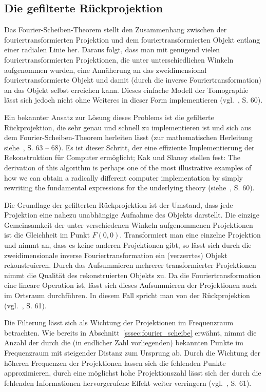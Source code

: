 \subsection{Die gefilterte Rückprojektion}\label{sssec:filter_bp}

Das Fourier-Scheiben-Theorem stellt den Zusammenhang zwischen der fouriertransformierten Projektion und dem
fouriertransformierten Objekt entlang einer radialen Linie her. Daraus folgt, dass man mit genügend vielen
fouriertransformierten Projektionen, die unter unterschiedlichen Winkeln aufgenommen wurden, eine Annäherung an das
zweidimensional fouriertransformierte Objekt und damit (durch die inverse Fouriertransformation) an das Objekt selbst
erreichen kann. Dieses einfache Modell der Tomographie lässt sich jedoch nicht ohne Weiteres in dieser Form
implementieren (vgl.~\cite{kakslan}, S. 60).

Ein bekannter Ansatz zur Lösung dieses Problems ist die gefilterte Rückprojektion, die sehr genau und schnell zu
implementieren ist und sich aus dem Fourier-Scheiben-Theorem herleiten lässt (zur mathematischen Herleitung
siehe~\cite{kakslan}, S. 63 -- 68). Es ist dieser Schritt, der eine effiziente Implementierung der Rekonstruktion für
Computer ermöglicht; Kak und Slaney stellen fest: {\glqq}The derivation of this algorithm is perhaps one of the most
illustrative examples of how we can obtain a radically different computer implementation by simply rewriting the
fundamental expressions for the underlying theory{\grqq} (siehe~\cite{kakslan}, S. 60).

Die Grundlage der gefilterten Rückprojektion ist der Umstand, dass jede Projektion eine nahezu unabhängige Aufnahme
des Objekts darstellt. Die einzige Gemeinsamkeit der unter verschiedenen Winkeln aufgenommenen Projektionen ist die
Gleichheit im Punkt $F(0, 0)$. Transformiert man eine einzelne Projektion und nimmt an, dass es keine anderen
Projektionen gibt, so lässt sich durch die zweidimensionale inverse Fouriertransformation ein (verzerrtes) Objekt
rekonstruieren. Durch das Aufsummieren mehrerer transformierter Projektionen nimmt die Qualität des rekonstruierten
Objekts zu. Da die Fouriertransformation eine lineare Operation ist, lässt sich dieses Aufsummieren der Projektionen
auch im Ortsraum durchführen. In diesem Fall spricht man von der Rückprojektion (vgl.~\cite{kakslan}, S. 61).

Die Filterung lässt sich als Wichtung der Projektionen im Frequenzraum betrachten. Wie bereits in
Abschnitt~\ref{sssec:fourier_scheibe} erwähnt, nimmt die Anzahl der durch die (in endlicher Zahl vorliegenden) bekannten
Punkte im Frequenzraum mit steigender Distanz zum Ursprung ab. Durch die Wichtung der höheren Frequenzen der
Projektionen lassen sich die fehlenden Punkte approximieren, durch eine möglichst hohe Projektionszahl lässt sich der 
durch die fehlenden Informationen hervorgerufene Effekt weiter verringern (vgl.~\cite{kakslan}, S. 61).

